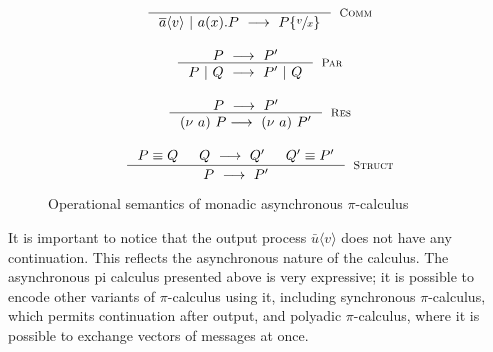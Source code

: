 \documentclass[12pt,twoside]{report}
\begin{document}
\begin{figure}[h!]
    \centering
    \begin{equation*}
    \centering
    \begin{array}{c}
    \inference{}{\overline{a}\langle v \rangle\ |\ a(x).P\ \longrightarrow\ P\{\sfrac{v}{x}\}}[\textsc{Comm}]\\[20pt]
    \inference{P\ \longrightarrow\ P'}{P\ |\ Q\ \longrightarrow\ P'\ |\ Q}[\textsc{Par}]\\[20pt]
    \inference{P\ \longrightarrow\ P'}{(\nu\ a)\ P \longrightarrow\ (\nu\ a)\ P'}[\textsc{Res}]\\[20pt]
    \inference{
        P \equiv Q 
        & Q\ \longrightarrow\ Q' 
        & Q' \equiv P'
    }{P\ \longrightarrow\ P'}[\textsc{Struct}]
    \end{array}
    \end{equation*}
    \caption{Operational semantics of monadic asynchronous $\pi$-calculus}
    \label{picalc_op_sem}
\end{figure}{}

It is important to notice that the output process $\bar{u} \langle v \rangle$ does not have any continuation. This reflects the asynchronous nature of the calculus. The asynchronous pi calculus presented above is very expressive; it is possible to encode other variants of $\pi$-calculus using it, including synchronous $\pi$-calculus, which permits continuation after output, and polyadic $\pi$-calculus, where it is possible to exchange vectors of messages at once. 


         
\end{document}
